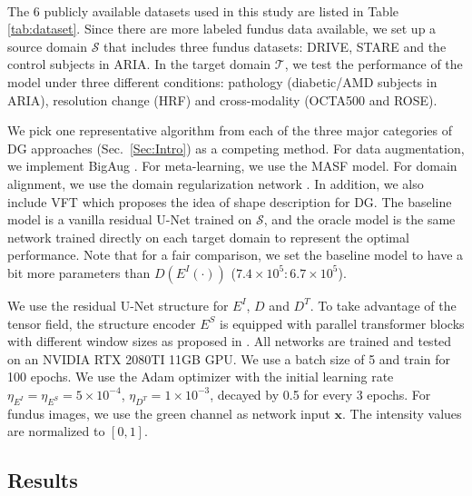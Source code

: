 \documentclass[runningheads]{llncs}
\begin{document}
\paragraph{}The 6 publicly available datasets used in this study are listed in Table \ref{tab:dataset}. Since there are more labeled fundus data available, we set up a source domain $\mathcal{S}$ that includes three fundus datasets: DRIVE, STARE and the control subjects in ARIA. In the target domain $\mathcal{T}$, we test the performance of the model under three different conditions: pathology (diabetic/AMD subjects in ARIA), resolution change (HRF) and cross-modality (OCTA500 and ROSE).

 We pick one representative algorithm from each of the three major categories of DG approaches (Sec.~\ref{Sec:Intro}) as a competing method. For data augmentation, we implement BigAug \cite{zhang2020generalizing}. For meta-learning, we use the MASF \cite{dou2019domain} model. For domain alignment, we use the domain regularization network \cite{aslani2020scanner}. In addition, we also include VFT \cite{hu2021domain} which proposes the idea of shape description for DG. The baseline model is a vanilla residual U-Net trained on $\mathcal{S}$, and the oracle model is the same network trained directly on each target domain to represent the optimal performance. Note that for a fair comparison, we set the baseline model to have a bit more parameters than $D(E^I(\cdot))$ ($7.4\times 10^5:6.7\times 10^5$). 



 We use the residual U-Net structure for $E^I$, $D$ and $D^T$. To take advantage of the tensor field, the structure encoder $E^S$ is equipped with parallel transformer blocks with different window sizes as proposed in \cite{hu2021domain}. All networks are trained and tested on an NVIDIA RTX 2080TI 11GB GPU. We use a batch size of 5 and train for 100 epochs. We use the Adam optimizer with the initial learning rate $\eta_{E^I} = \eta_{E^S} = 5\times 10^{-4}$, $\eta_{D^T} = 1\times 10^{-3}$, decayed by 0.5 for every 3 epochs. For fundus images, we use the green channel as network input $\mathbf{x}$. The intensity values are normalized to $[0,1]$.

\subsection{Results} \label{Sec:Evaluation}
\end{document}
